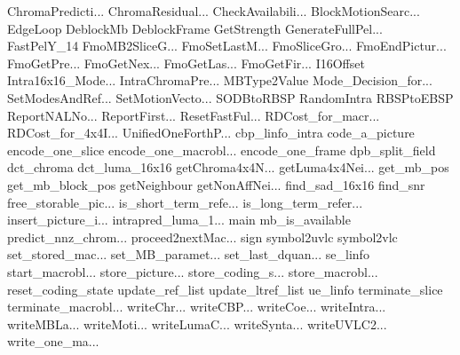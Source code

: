 ChromaPredicti...
ChromaResidual...
CheckAvailabili...
BlockMotionSearc...
EdgeLoop
DeblockMb
DeblockFrame
GetStrength
GenerateFullPel...
FastPelY_14
FmoMB2SliceG...
FmoSetLastM...
FmoSliceGro...
FmoEndPictur...
FmoGetPre...
FmoGetNex...
FmoGetLas...
FmoGetFir...
I16Offset
Intra16x16_Mode...
IntraChromaPre...
MBType2Value
Mode_Decision_for...
SetModesAndRef...
SetMotionVecto...
SODBtoRBSP
RandomIntra
RBSPtoEBSP
ReportNALNo...
ReportFirst...
ResetFastFul...
RDCost_for_macr...
RDCost_for_4x4I...
UnifiedOneForthP...
cbp_linfo_intra
code_a_picture
encode_one_slice
encode_one_macrobl...
encode_one_frame
dpb_split_field
dct_chroma
dct_luma_16x16
getChroma4x4N...
getLuma4x4Nei...
get_mb_pos
get_mb_block_pos
getNeighbour
getNonAffNei...
find_sad_16x16
find_snr
free_storable_pic...
is_short_term_refe...
is_long_term_refer...
insert_picture_i...
intrapred_luma_1...
main
mb_is_available
predict_nnz_chrom...
proceed2nextMac...
sign
symbol2uvlc
symbol2vlc
set_stored_mac...
set_MB_paramet...
set_last_dquan...
se_linfo
start_macrobl...
store_picture...
store_coding_s...
store_macrobl...
reset_coding_state
update_ref_list
update_ltref_list
ue_linfo
terminate_slice
terminate_macrobl...
writeChr...
writeCBP...
writeCoe...
writeIntra...
writeMBLa...
writeMoti...
writeLumaC...
writeSynta...
writeUVLC2...
write_one_ma...
